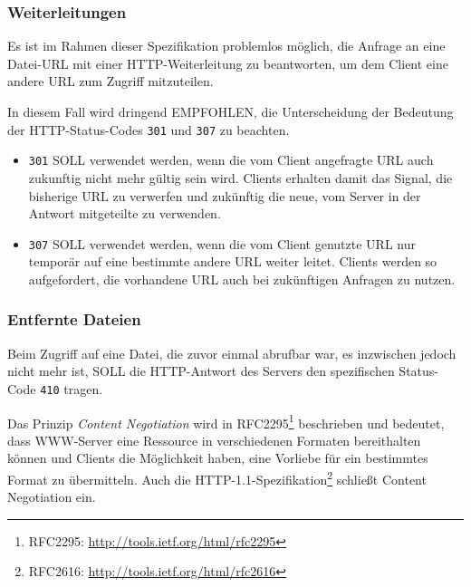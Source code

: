 \documentclass[,a4paper]{article}
\begin{document}
\subsubsection{Weiterleitungen}\label{weiterleitungen}

Es ist im Rahmen dieser Spezifikation problemlos möglich, die Anfrage an
eine Datei-URL mit einer HTTP-Weiterleitung zu beantworten, um dem
Client eine andere URL zum Zugriff mitzuteilen.

In diesem Fall wird dringend EMPFOHLEN, die Unterscheidung der Bedeutung
der HTTP-Status-Codes \texttt{301} und \texttt{307} zu beachten.

\begin{itemize}
\item
  \texttt{301} SOLL verwendet werden, wenn die vom Client angefragte URL
  auch zukunftig nicht mehr gültig sein wird. Clients erhalten damit das
  Signal, die bisherige URL zu verwerfen und zukünftig die neue, vom
  Server in der Antwort mitgeteilte zu verwenden.
\item
  \texttt{307} SOLL verwendet werden, wenn die vom Client genutzte URL
  nur temporär auf eine bestimmte andere URL weiter leitet. Clients
  werden so aufgefordert, die vorhandene URL auch bei zukünftigen
  Anfragen zu nutzen.
\end{itemize}

\subsubsection{Entfernte Dateien}\label{entfernte-dateien}

Beim Zugriff auf eine Datei, die zuvor einmal abrufbar war, es
inzwischen jedoch nicht mehr ist, SOLL die HTTP-Antwort des Servers den
spezifischen Status-Code \texttt{410} tragen.


Das Prinzip \emph{Content Negotiation} wird in RFC2295\footnote{RFC2295:
  \url{http://tools.ietf.org/html/rfc2295}} beschrieben und bedeutet,
dass WWW-Server eine Ressource in verschiedenen Formaten bereithalten
können und Clients die Möglichkeit haben, eine Vorliebe für ein
bestimmtes Format zu übermitteln. Auch die
HTTP-1.1-Spezifikation\footnote{RFC2616:
  \url{http://tools.ietf.org/html/rfc2616}} schließt Content Negotiation
ein.
\end{document}
